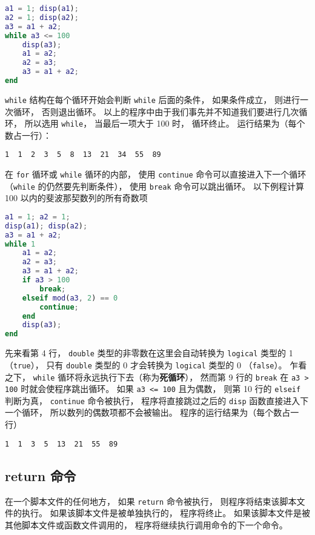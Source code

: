 \begin{lstlisting}[language=matlab, caption=fibonacci.m]
a1 = 1; disp(a1); 
a2 = 1; disp(a2);
a3 = a1 + a2;
while a3 <= 100
    disp(a3);
    a1 = a2;
    a2 = a3;
    a3 = a1 + a2;
end
\end{lstlisting}

\verb|while| 结构在每个循环开始会判断 \verb|while| 后面的条件， 如果条件成立， 则进行一次循环， 否则退出循环。 以上的程序中由于我们事先并不知道我们要进行几次循环， 所以选用 \verb|while|， 当最后一项大于 100 时， 循环终止。 运行结果为（每个数占一行）：
\begin{lstlisting}[language=matlabC]
1  1  2  3  5  8  13  21  34  55  89
\end{lstlisting}

在 \verb|for| 循环或 \verb|while| 循环的内部， 使用 \verb|continue| 命令可以直接进入下一个循环（\verb|while| 的仍然要先判断条件）， 使用 \verb|break| 命令可以跳出循环。 以下例程计算 100 以内的斐波那契数列的所有奇数项

\begin{lstlisting}[language=matlab, caption=fibonacciOdd.m]
a1 = 1; a2 = 1;
disp(a1); disp(a2);
a3 = a1 + a2;
while 1
    a1 = a2;
    a2 = a3;
    a3 = a1 + a2;
    if a3 > 100
        break;
    elseif mod(a3, 2) == 0
        continue;
    end
    disp(a3);
end
\end{lstlisting}

先来看第 4 行， \verb|double| 类型的非零数在这里会自动转换为 \verb|logical| 类型的 1 （\verb|true|）， 只有 \verb|double| 类型的 0 才会转换为 \verb|logical| 类型的 0 （\verb|false|）。 乍看之下， \verb|while| 循环将永远执行下去（称为\textbf{死循环}）， 然而第 9 行的 \verb|break| 在 \verb|a3 > 100| 时就会使程序跳出循环。 如果 \verb|a3 <= 100| 且为偶数， 则第 10 行的 \verb|elseif| 判断为真， \verb|continue| 命令被执行， 程序将直接跳过之后的 \verb|disp| 函数直接进入下一个循环， 所以数列的偶数项都不会被输出。 程序的运行结果为（每个数占一行）
\begin{lstlisting}[language=matlabC]
1  1  3  5  13  21  55  89
\end{lstlisting}

\subsection{return 命令}
在一个脚本文件的任何地方， 如果 \verb|return| 命令被执行， 则程序将结束该脚本文件的执行。 如果该脚本文件是被单独执行的， 程序将终止。 如果该脚本文件是被其他脚本文件或函数文件调用的， 程序将继续执行调用命令的下一个命令。

